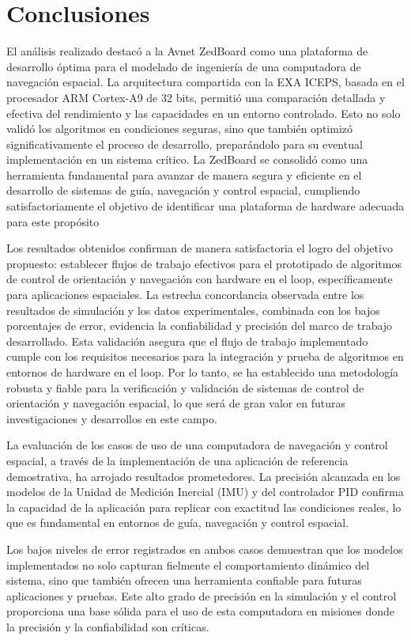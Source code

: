 \chapter{Conclusiones}

El análisis realizado destacó a la Avnet ZedBoard como una plataforma de desarrollo óptima para el modelado de ingeniería de una computadora de navegación espacial. La arquitectura compartida con la EXA ICEPS, basada en el procesador ARM Cortex-A9 de 32 bits, permitió una comparación detallada y efectiva del rendimiento y las capacidades en un entorno controlado. Esto no solo validó los algoritmos en condiciones seguras, sino que también optimizó significativamente el proceso de desarrollo, preparándolo para su eventual implementación en un sistema crítico. La ZedBoard se consolidó como una herramienta fundamental para avanzar de manera segura y eficiente en el desarrollo de sistemas de guía, navegación y control espacial, cumpliendo satisfactoriamente el objetivo de identificar una plataforma de hardware adecuada para este propósito

Los resultados obtenidos confirman de manera satisfactoria el logro del objetivo propuesto: establecer flujos de trabajo efectivos para el prototipado de algoritmos de control de orientación y navegación con hardware en el loop, específicamente para aplicaciones espaciales. La estrecha concordancia observada entre los resultados de simulación y los datos experimentales, combinada con los bajos porcentajes de error, evidencia la confiabilidad y precisión del marco de trabajo desarrollado. Esta validación asegura que el flujo de trabajo implementado cumple con los requisitos necesarios para la integración y prueba de algoritmos en entornos de hardware en el loop. Por lo tanto, se ha establecido una metodología robusta y fiable para la verificación y validación de sistemas de control de orientación y navegación espacial, lo que será de gran valor en futuras investigaciones y desarrollos en este campo.

La evaluación de los casos de uso de una computadora de navegación y control espacial, a través de la implementación de una aplicación de referencia demostrativa, ha arrojado resultados prometedores. La precisión alcanzada en los modelos de la Unidad de Medición Inercial (IMU) y del controlador PID confirma la capacidad de la aplicación para replicar con exactitud las condiciones reales, lo que es fundamental en entornos de guía, navegación y control espacial.

Los bajos niveles de error registrados en ambos casos demuestran que los modelos implementados no solo capturan fielmente el comportamiento dinámico del sistema, sino que también ofrecen una herramienta confiable para futuras aplicaciones y pruebas. Este alto grado de precisión en la simulación y el control proporciona una base sólida para el uso de esta computadora en misiones donde la precisión y la confiabilidad son críticas.

